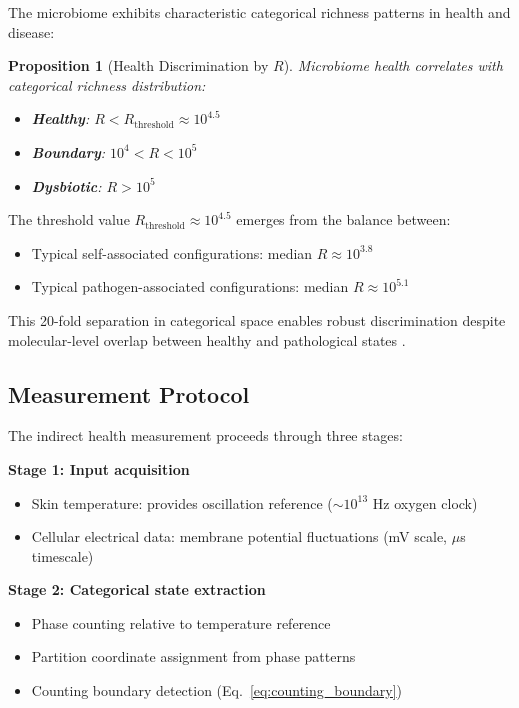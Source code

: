 \documentclass[twocolumn,10pt]{article}
\newtheorem{proposition}[theorem]{Proposition}
\begin{document}
The microbiome exhibits characteristic categorical richness patterns in health and disease:

\begin{proposition}[Health Discrimination by $R$]
\label{prop:health_discrimination}
Microbiome health correlates with categorical richness distribution:
\begin{itemize}
    \item \textbf{Healthy}: $R < R_{\text{threshold}} \approx 10^{4.5}$
    \item \textbf{Boundary}: $10^4 < R < 10^5$
    \item \textbf{Dysbiotic}: $R > 10^5$
\end{itemize}
\end{proposition}

The threshold value $R_{\text{threshold}} \approx 10^{4.5}$ emerges from the balance between:
\begin{itemize}
    \item Typical self-associated configurations: median $R \approx 10^{3.8}$
    \item Typical pathogen-associated configurations: median $R \approx 10^{5.1}$
\end{itemize}

This 20-fold separation in categorical space enables robust discrimination despite molecular-level overlap between healthy and pathological states \cite{turnbaugh2007,qin2010}.

\subsection{Measurement Protocol}

The indirect health measurement proceeds through three stages:

\textbf{Stage 1: Input acquisition}
\begin{itemize}
    \item Skin temperature: provides oscillation reference ($\sim 10^{13}$ Hz oxygen clock)
    \item Cellular electrical data: membrane potential fluctuations (mV scale, $\mu$s timescale)
\end{itemize}

\textbf{Stage 2: Categorical state extraction}
\begin{itemize}
    \item Phase counting relative to temperature reference
    \item Partition coordinate assignment from phase patterns
    \item Counting boundary detection (Eq.~\ref{eq:counting_boundary})
\end{itemize}
\end{document}
